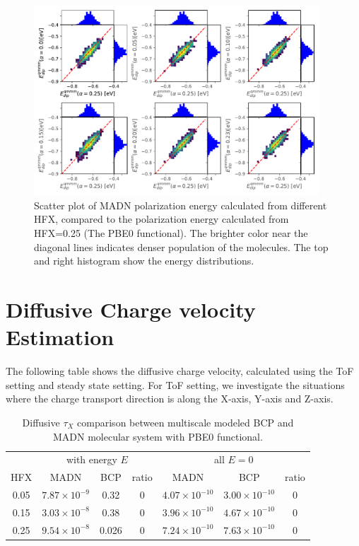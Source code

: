 \documentclass[letterpaper,12pt]{article}
\begin{document}
\begin{figure}[H]
    \centering
    \includegraphics[width=0.95\textwidth]{figs/MADN_HFX/scatterEdip_qmmm.pdf}
    \caption{Scatter plot of MADN polarization energy calculated from different HFX, compared to the polarization energy calculated from HFX=0.25 (The PBE0 functional). The brighter color near the diagonal lines indicates denser population of the molecules.  The top and right histogram show the energy distributions.}
    \label{fig:Edip_qmmm_MADN}
\end{figure}
 
\section{Diffusive Charge velocity Estimation}
The following table shows the diffusive charge velocity, calculated using the ToF setting and steady state setting. For ToF setting, we investigate the situations where the charge transport direction is along the X-axis, Y-axis and Z-axis. 
\begin{table}[htbp]
\centering
\begin{tabular}{c c c c c c c}
    \toprule
     &
        \multicolumn{3}{c}{ with energy $E$} &
        \multicolumn{3}{c}{all $E=0$}  \\
    HFX & MADN & BCP & ratio & MADN & BCP & ratio  \\
    \cmidrule(r){1-7}
    0.05 & $7.87 \times 10^{-9}$ & 0.32 & 0 & $4.07 \times 10^{-10}$ & $3.00 \times 10^{-10}$ & 0 \\
    0.15 & $3.03 \times 10^{-8}$ & 0.38 & 0 & $3.96 \times 10^{-10}$ & $4.67 \times 10^{-10}$ & 0 \\
    0.25 & $9.54 \times 10^{-8}$ & 0.026 & 0 & $7.24 \times 10^{-10}$ & $7.63 \times 10^{-10}$ & 0 \\
    \bottomrule
    \end{tabular}
    \caption{Diffusive $\tau_X$ comparison between multiscale modeled BCP and MADN molecular system with PBE0 functional. }
\end{table}
\end{document}
